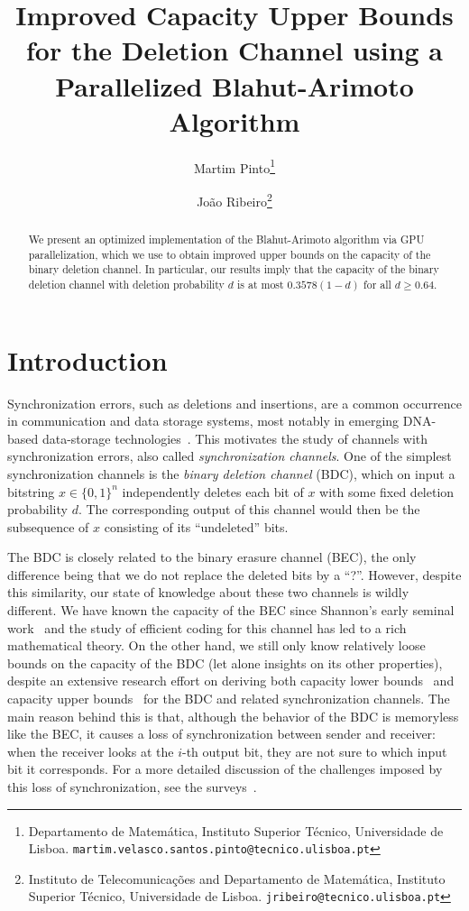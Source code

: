 \documentclass[11pt]{article}
\title{Improved Capacity Upper Bounds for the Deletion Channel using a Parallelized Blahut-Arimoto Algorithm
}
\author{Martim Pinto\thanks{Departamento de Matemática, Instituto Superior Técnico, Universidade de Lisboa.
\texttt{martim.velasco.santos.pinto@tecnico.ulisboa.pt}} \and João Ribeiro\thanks{Instituto de Telecomunicações and Departamento de Matemática, Instituto Superior Técnico, Universidade de Lisboa. \texttt{jribeiro@tecnico.ulisboa.pt}}
}
\date{}
\newcommand{\bits}{\{0,1\}}
\begin{document}
	
\maketitle
	
\begin{abstract}
We present an optimized implementation of the Blahut-Arimoto algorithm via GPU parallelization,
which we use to obtain improved upper bounds on the capacity of the binary deletion channel.
In particular, our results imply that the capacity of the binary deletion channel with deletion probability $d$ is at most $0.3578(1-d)$ for all $d\geq 0.64$.




\end{abstract}

\newpage

\tableofcontents

\newpage



\section{Introduction}\label{sec:intro}


Synchronization errors, such as deletions and insertions, are a common occurrence in communication and data storage systems, most notably in emerging DNA-based data-storage technologies~\cite{YGM17,OAC+18,HMG19,WGGH23}.
This motivates the study of channels with synchronization errors, also called \emph{synchronization channels}.
One of the simplest synchronization channels is the \emph{binary deletion channel} (BDC), which on input a bitstring $x\in\bits^n$ independently deletes each bit of $x$ with some fixed deletion probability $d$.
The corresponding output of this channel would then be the subsequence of $x$ consisting of its ``undeleted'' bits.

The BDC is closely related to the binary erasure channel (BEC), the only difference being that we do not replace the deleted bits by a ``?''.
However, despite this similarity, our state of knowledge about these two channels is wildly different.
We have known the capacity of the BEC since Shannon's early seminal work~\cite{Sha48} and the study of efficient coding for this channel has led to a rich mathematical theory.
On the other hand, we still only know relatively loose bounds on the capacity of the BDC (let alone insights on its other properties), despite an extensive research effort on deriving both capacity lower bounds~\cite{Gal61,VD68,Zig69,DG06,MD06,DM07,DK07,Mit08,KD10,MTL12,RA13,VTR13,CK15,ISW16,RC23} and capacity upper bounds~\cite{DMP07,Mit08,FD10,Dal11,MTL12,RD15,Che19,CR19b,RC23} for the BDC and related synchronization channels.
The main reason behind this is that, although the behavior of the BDC is memoryless like the BEC, it causes a loss of synchronization between sender and receiver: when the receiver looks at the $i$-th output bit, they are not sure to which input bit it corresponds.
For a more detailed discussion of the challenges imposed by this loss of synchronization, see the surveys~\cite{Mit09,MBT10,CR20,HS21}.
\end{document}
